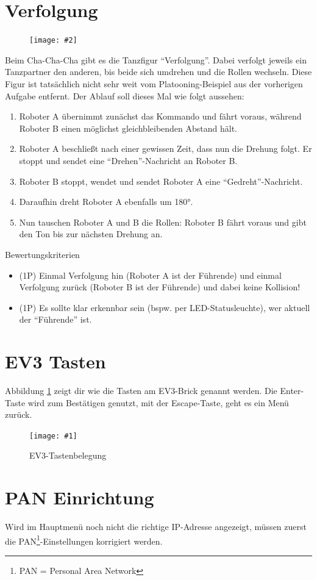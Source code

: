 \documentclass[
	12pt,
	article,
	type=bsc, %
	colorbacktitle,
	instlogo,
	accentcolor=tud1c,
	draft,
	german,
	twoside
]{tudexercise}
\newcommand{\gcenter}[4]{
	\begin{figure}[h]
	\centering 
	\texttt{[image: \#1]}
	\caption{#2}
	\label{fig:#3}
	\end{figure}
}
\newcommand{\easygcenter}[2]{
	\begin{figure}[h]
	\centering 
	\texttt{[image: \#2]}
	\end{figure}
}
\begin{document}
	\section{Verfolgung}
	\easygcenter{.8\textwidth}{img/task_chachacha.png}
	Beim Cha-Cha-Cha gibt es die Tanzfigur “Verfolgung”. Dabei verfolgt jeweils ein Tanzpartner den anderen, bis beide sich umdrehen und die Rollen wechseln. Diese Figur ist tatsächlich nicht sehr weit vom Platooning-Beispiel aus der vorherigen Aufgabe entfernt.
	Der Ablauf soll dieses Mal wie folgt aussehen:
	\begin{enumerate}
	\item  Roboter A übernimmt zunächst das Kommando und fährt voraus, während Roboter B einen möglichst gleichbleibenden Abstand hält.
	\item  Roboter A beschließt nach einer gewissen Zeit, dass nun die Drehung folgt. Er stoppt und sendet eine “Drehen”-Nachricht an Roboter B.
	\item  Roboter B stoppt, wendet und sendet Roboter A eine “Gedreht”-Nachricht.
	\item  Daraufhin dreht Roboter A ebenfalls um 180°.
	\item  Nun tauschen Roboter A und B die Rollen: Roboter B fährt voraus und gibt den Ton bis zur nächsten Drehung an.
	\end{enumerate}
	Bewertungskriterien
	\begin{itemize}
	\item (1P) Einmal Verfolgung hin (Roboter A ist der Führende) und einmal Verfolgung zurück (Roboter B ist der Führende) und dabei keine Kollision!
	\item (1P) Es sollte klar erkennbar sein (bspw. per LED-Statusleuchte), wer aktuell der “Führende” ist.
	\end{itemize}
	
	\newpage
	
	\appendix
	\section{EV3 Tasten}
	Abbildung \ref{fig:buttons} zeigt dir wie die Tasten am EV3-Brick genannt werden. Die Enter-Taste wird zum Bestätigen genutzt, mit der Escape-Taste, geht es ein Menü zurück. 
		\gcenter{img/ev3_buttons.jpg}{EV3-Tastenbelegung\protect\footnotemark\ }{buttons}{.5\textwidth}
	
	\newpage
	\section{PAN Einrichtung}
	\label{sec:pan}
			Wird im Hauptmenü noch nicht die richtige IP-Adresse angezeigt, müssen zuerst die PAN\footnote{PAN = Personal Area Network}-Einstellungen korrigiert werden.
		
\end{document}
